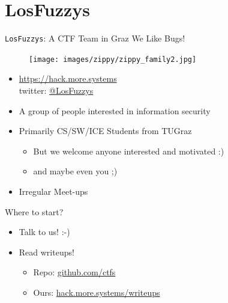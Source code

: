 \section{LosFuzzys}

\begin{frame}[allowframebreaks]
  {\texttt{LosFuzzys}: A CTF Team in Graz}
  {We Like Bugs!}

  \begin{figure}[H]
    \centering
    \texttt{[image: images/zippy/zippy\_family2.jpg]}
  \end{figure}

  \framebreak

  \begin{itemize}
    \item \url{https://hack.more.systems}
      \\ twitter: \href{https://twitter.com/LosFuzzys}{@LosFuzzys}
    \item A group of people interested in information security
    \item Primarily CS/SW/ICE Students from TUGraz
      \begin{itemize}
        \item But we welcome anyone interested and motivated :)
        \item and maybe even you ;)
      \end{itemize}
    \item Irregular Meet-ups
  \end{itemize}
\end{frame}

\begin{frame}
	{Where to start?}
	
	\begin{itemize}
		\item Talk to us! :-)
	\end{itemize}
	
	\begin{itemize}
		\item Read writeups!
		\begin{itemize}
			\item Repo: \href{https://github.com/ctfs}{github.com/ctfs}
			\item Ours: \href{https://hack.more.systems/writeups}{hack.more.systems/writeups}
		\end{itemize}
	\end{itemize}
	
\end{frame}

